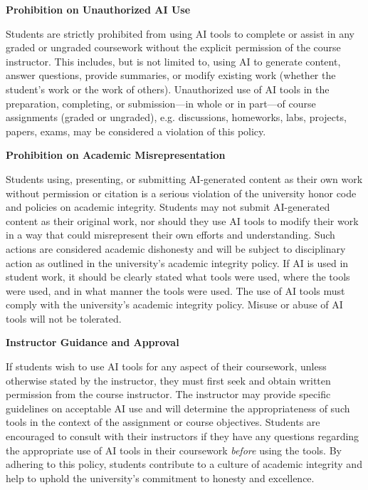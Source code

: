 \documentclass[11pt,letterpaper]{article}
\begin{document}
{\bfseries Prohibition on Unauthorized AI Use} \par
Students are strictly prohibited from using AI tools to complete or assist in any graded or ungraded coursework without the explicit permission of the course instructor. This includes, but is not limited to, using AI to generate content, answer questions, provide summaries, or modify existing work (whether the student's work or the work of others). Unauthorized use of AI tools in the preparation, completing, or submission---in whole or in part---of course assignments (graded or ungraded), e.g. discussions, homeworks, labs, projects, papers, exams, may be considered a violation of this policy. \pspace

{\bfseries Prohibition on Academic Misrepresentation} \par
Students using, presenting, or submitting AI-generated content as their own work without permission or citation is a serious violation of the university honor code and policies on academic integrity. Students may not submit AI-generated content as their original work, nor should they use AI tools to modify their work in a way that could misrepresent their own efforts and understanding. Such actions are considered academic dishonesty and will be subject to disciplinary action as outlined in the university's academic integrity policy. If AI is used in student work, it should be clearly stated what tools were used, where the tools were used, and in what manner the tools were used. The use of AI tools must comply with the university's academic integrity policy. Misuse or abuse of AI tools will not be tolerated. \pspace

{\bfseries Instructor Guidance and Approval} \par
If students wish to use AI tools for any aspect of their coursework, unless otherwise stated by the instructor, they must first seek and obtain written permission from the course instructor. The instructor may provide specific guidelines on acceptable AI use and will determine the appropriateness of such tools in the context of the assignment or course objectives. Students are encouraged to consult with their instructors if they have any questions regarding the appropriate use of AI tools in their coursework \textit{before} using the tools. By adhering to this policy, students contribute to a culture of academic integrity and help to uphold the university's commitment to honesty and excellence. \sectionbreak
\end{document}
